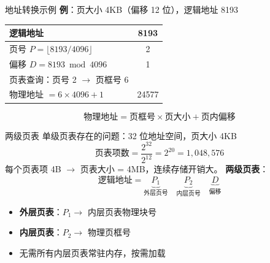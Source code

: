 \documentclass[10pt, aspectratio=169]{beamer}
\begin{document}
\begin{frame}{地址转换示例}
    \textbf{例}：页大小 4KB（偏移 12 位），逻辑地址 8193
    
    \vspace{0.5em}
    \begin{center}
        \begin{tabular}{|l|c|}
            \hline
            逻辑地址 & 8193 \\
            \hline
            页号 $P = \lfloor 8193 / 4096 \rfloor$ & 2 \\
            \hline
            偏移 $D = 8193 \bmod 4096$ & 1 \\
            \hline
            页表查询：页号 2 $\rightarrow$ 页框号 6 \\
            \hline
            物理地址 $= 6 \times 4096 + 1$ & 24577 \\
            \hline
        \end{tabular}
    \end{center}
    \[
    \text{物理地址} = \text{页框号} \times \text{页大小} + \text{页内偏移}
    \]
\end{frame}

\begin{frame}{两级页表}
    单级页表存在的问题：32 位地址空间，页大小 4KB
    \[
    \text{页表项数} = \frac{2^{32}}{2^{12}} = 2^{20} = 1,048,576
    \]
    每个页表项 4B $\rightarrow$ 页表大小 = 4MB，连续存储开销大。
    \vspace{0.5em}
    \textbf{两级页表}：
    \[
    \text{逻辑地址} = \underbrace{P_1}_{\text{外层页号}} \quad
    \underbrace{P_2}_{\text{内层页号}} \quad
    \underbrace{D}_{\text{偏移}}
    \]
    \begin{itemize}
        \item \textbf{外层页表}：$P_1 \rightarrow$ 内层页表物理块号
        \item \textbf{内层页表}：$P_2 \rightarrow$ 物理页框号
        \item 无需所有内层页表常驻内存，按需加载
    \end{itemize}
\end{frame}
\end{document}
